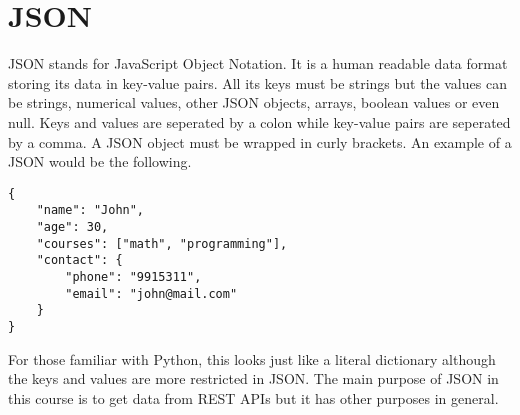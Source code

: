 \graphicspath{{./lab04/Images/}}


\maketocpage

\section{JSON}
JSON stands for JavaScript Object Notation. It is a human readable data format storing its data in key-value pairs. All its keys must be strings but the values can be strings, numerical values, other JSON objects, arrays, boolean values or even null. Keys and values are seperated by a colon while key-value pairs are seperated by a comma. A JSON object must be wrapped in curly brackets. An example of a JSON would be the following.
\begin{lstlisting}[style=A_JAVA]
{
	"name": "John",
	"age": 30,
	"courses": ["math", "programming"],
	"contact": {
		"phone": "9915311",
		"email": "john@mail.com"
	}
}
\end{lstlisting}
For those familiar with Python, this looks just like a literal dictionary although the keys and values are more restricted in JSON. The main purpose of JSON in this course is to get data from REST APIs but it has other purposes in general.

